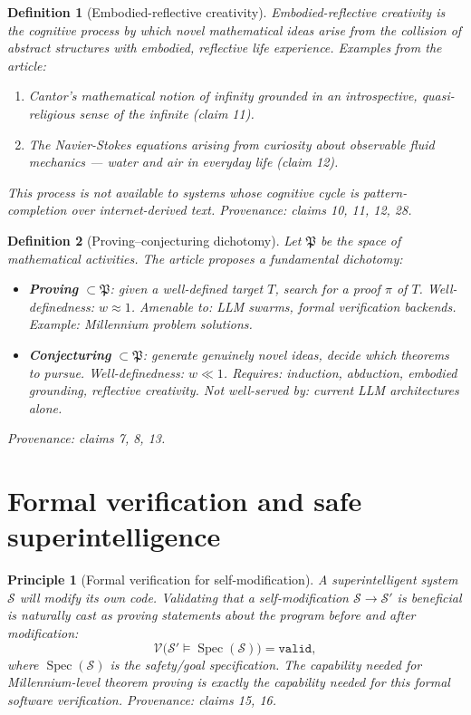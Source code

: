\documentclass[11pt]{article}
\newtheorem{definition}{Definition}
\newtheorem{principle}{Principle}
\DeclareMathOperator{\Spec}{Spec}
\newcommand{\cS}{\mathcal{S}}
\newcommand{\cV}{\mathcal{V}}
\begin{document}
\begin{definition}[Embodied-reflective creativity]\label{def:embodied}
\emph{Embodied-reflective creativity} is the cognitive process by which novel
mathematical ideas arise from the collision of abstract structures with
embodied, reflective life experience.  Examples from the article:
\begin{enumerate}
  \item Cantor's mathematical notion of infinity grounded in an
    introspective, quasi-religious sense of the infinite (claim 11).
  \item The Navier-Stokes equations arising from curiosity about
    observable fluid mechanics --- water and air in everyday life (claim 12).
\end{enumerate}
This process is not available to systems whose cognitive cycle is
pattern-completion over internet-derived text.
\emph{Provenance: claims 10, 11, 12, 28.}
\end{definition}

\begin{definition}[Proving--conjecturing dichotomy]\label{def:dichotomy}
Let $\mathfrak{P}$ be the space of mathematical activities.  The article
proposes a fundamental dichotomy:
\begin{itemize}
  \item \textbf{Proving} $\subset \mathfrak{P}$: given a well-defined
    target $T$, search for a proof $\pi$ of $T$.
    Well-definedness: $w \approx 1$.
    Amenable to: LLM swarms, formal verification backends.
    Example: Millennium problem solutions.
  \item \textbf{Conjecturing} $\subset \mathfrak{P}$: generate genuinely
    novel ideas, decide which theorems to pursue.
    Well-definedness: $w \ll 1$.
    Requires: induction, abduction, embodied grounding, reflective creativity.
    Not well-served by: current LLM architectures alone.
\end{itemize}
\emph{Provenance: claims 7, 8, 13.}
\end{definition}


\section{Formal verification and safe superintelligence}

\begin{principle}[Formal verification for self-modification]\label{pr:fvmod}
A superintelligent system $\cS$ will modify its own code.  Validating
that a self-modification $\cS \to \cS'$ is beneficial is naturally cast as
proving statements about the program before and after modification:
\[
  \cV\bigl(\cS' \models \Spec(\cS)\bigr) = \texttt{valid},
\]
where $\Spec(\cS)$ is the safety/goal specification.  The capability needed
for Millennium-level theorem proving is exactly the capability needed for
this formal software verification.
\emph{Provenance: claims 15, 16.}
\end{principle}
\end{document}
